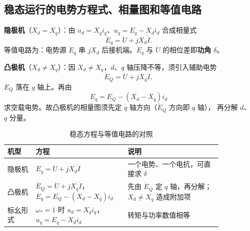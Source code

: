 \subsection{稳态运行的电势方程式、相量图和等值电路}

\textbf{隐极机}（$X_d=X_q$）：由 $u_d=X_qi_q$、$u_q=E_q-X_di_d$ 合成相量式
\begin{equation}
  \dot E_q=\dot U+jX_d\dot I .
\end{equation}
等值电路为：电势源 $\dot E_q$ 串 $jX_d$ 后接机端。$\dot E_q$ 与 $\dot U$ 的相位差即\textbf{功角} $\delta$。

\textbf{凸极机}（$X_d\ne X_q$）：因 $X_d\ne X_q$，$d$、$q$ 轴压降不等，须引入辅助电势
\begin{equation}
  \dot E_Q=\dot U+jX_q\dot I ,
\end{equation}
$E_Q$ 落在 $q$ 轴上。再由
\begin{equation}
  E_q=E_Q-(X_d-X_q)i_d
\end{equation}
求空载电势。故凸极机的相量图须先定 $q$ 轴方向（$\dot E_Q$ 方向即 $q$ 轴），
再分解 $d$、$q$ 分量。

\begin{table}[htbp]
  \centering
  \caption{稳态方程与等值电路的对照}
  \small
  \begin{tabular}{@{}p{0.12\linewidth}p{0.34\linewidth}p{0.40\linewidth}@{}}
    \toprule
    机型 & 方程 & 说明 \\
    \midrule
    隐极机 & $\dot E_q=\dot U+jX_d\dot I$ & 一个电势、一个电抗，可直接求 $\delta$ \\
    凸极机 & $\dot E_Q=\dot U+jX_q\dot I$，\newline $E_q=E_Q-(X_d-X_q)i_d$ &
             先由 $\dot E_Q$ 定 $q$ 轴，再分解；$X_d\ne X_q$ 造成附加项 \\
    标幺形式 & $\omega_*=1$ 时 $u_d=X_qi_q$，$u_q=E_q-X_di_d$ & 转矩与功率数值相等 \\
    \bottomrule
  \end{tabular}
\end{table}

